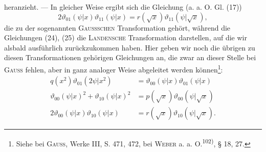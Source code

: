 \endgroup
\noindent heranzieht. — In gleicher Weise ergibt sich die Gleichung (a. a. O. Gl. (17))
\begingroup\makeatletter\tagsleft@true\let\veqno\leqno\makeatother
\begin{equation*}
2\vartheta_{01}(\psi|x)\vartheta_{11}(\psi|x)=r(\sqrt x)\vartheta_{11}(\psi|\sqrt x),\tag{27}
\end{equation*}
\endgroup
\noindent die zu der sogenannten \textsc{Gaussschen} Transformation gehört, während die Gleichungen (24), (25) die \textsc{Landensche} Transformation darstellen, auf die wir alsbald ausführlich zurückzukommen haben. Hier geben wir noch die übrigen
zu diesen Transformationen gehörigen Gleichungen an, die zwar an dieser
Stelle bei \textsc{Gauss} fehlen, aber in ganz analoger Weise abgeleitet werden
können\footnote{Siehe bei \textsc{Gauss}, Werke III, S. 471, 472, bei \textsc{Weber} a. a. O.\textsuperscript{102)}, § 18, 27.}:
\begingroup\makeatletter\tagsleft@true\let\veqno\leqno\makeatother
\begin{align*}
q(x^2)\vartheta_{01}(2\psi|x^2)&=\vartheta_{00}(\psi|x)\vartheta_{01}(\psi|x)\tag{25\,a}\\
\vartheta_{00}(\psi|x)^2+\vartheta_{10}(\psi|x)^2&=p(\sqrt x)\vartheta_{00}(\psi|\sqrt x)\tag{27\,a}\\
2\vartheta_{00}(\psi|x)\vartheta_{10}(\psi|x)&=r(\sqrt x)\vartheta_{10}(\psi|\sqrt x).\tag{27\,b}
\end{align*}
\endgroup

